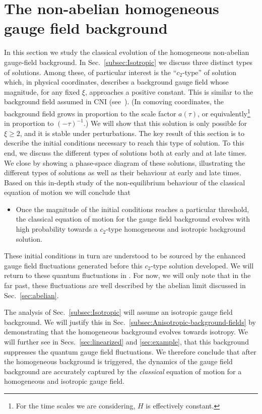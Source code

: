 
\section{The non-abelian homogeneous gauge field background \label{sec:background}}

In this section we study the classical evolution of the homogeneous non-abelian gauge-field background. In Sec.~\ref{subsec:Isotropic} we discuss three distinct types of solutions. Among these, of particular interest is the ``$c_{2}$\nobreakdash-type'' of solution which, in physical coordinates, describes a background gauge field whose magnitude, for any fixed $\xi$, approaches a positive constant. This is similar to the background field assumed in CNI (see~\cite{Dimastrogiovanni:2012st,Dimastrogiovanni:2012ew,Adshead:2013qp,Adshead:2013nka}). (In comoving coordinates, the background field grows in proportion to the scale factor $a(\tau)$, or equivalently\footnote{For the time scales we are considering, $H$ is effectively constant.} in proportion to $(-\tau)^{-1}$.) We will show that this solution is only possible for $\xi\geq2$, and it is stable under perturbations. The key result of this section is to describe the initial conditions necessary to reach this type of solution. To this end, we discuss the different types of solutions both at early and at late times. We close  by showing a phase-space diagram of these solutions, illustrating the different types of solutions as well as their behaviour at early and late times. Based on this in-depth study of the non-equilibrium behaviour of the classical equation of motion we will conclude that 
\begin{itemize}
\item Once the magnitude of the initial conditions reaches a particular threshold, the classical equation of motion for the gauge field background evolves with high probability towards a $c_{2}$\nobreakdash-type homogeneous and isotropic background solution. 
\end{itemize}
These initial conditions in turn are understood to be sourced by the enhanced gauge field fluctuations generated before this $c_{2}$\nobreakdash-type solution developed. We will return to these quantum fluctuations in . For now, we will only note that in the far past, these fluctuations are well described by the abelian limit discussed in Sec.~\ref{sec:abelian}.

The analysis of Sec.~\ref{subsec:Isotropic} will assume an isotropic gauge field background. We will justify this in Sec.~\ref{subsec:Anisotropic-background-fields} by demonstrating that the homogeneous background evolves towards isotropy. We will further see in Secs.~\ref{sec:linearized} and \ref{sec:example}, that this background suppresses the quantum gauge field fluctuations. We therefore conclude that after the homogeneous background is triggered, the dynamics of the gauge field background are accurately captured by the \emph{classical} equation of motion for a homogeneous and isotropic gauge field.

